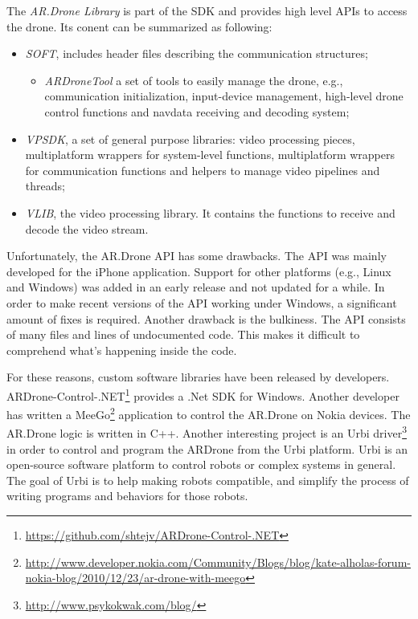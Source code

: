 The \textit{AR.Drone Library} is part of the SDK and provides high level APIs to access the drone.
Its conent can be summarized as following:
\begin{itemize}
\item \textit{SOFT}, includes header files describing the communication structures;
	\begin{itemize}
		\item \textit{ARDroneTool} a set of tools to easily manage the drone, e.g., communication initialization, input-device management, high-level drone control functions and navdata receiving and decoding system;
	\end{itemize}
\item \textit{VPSDK}, a set of general purpose libraries: video processing pieces, multiplatform wrappers for system-level functions, multiplatform wrappers for communication functions and helpers to manage video pipelines and threads;
\item \textit{VLIB}, the video processing library. It contains the functions to receive and decode the video stream.
\end{itemize}

Unfortunately, the AR.Drone API has some drawbacks.
The API was mainly developed for the iPhone application.
Support for other platforms (e.g., Linux and Windows) was added in an early release and not updated for a while.
In order to make recent versions of the API working under Windows, a significant amount of fixes is required.
Another drawback is the bulkiness.
The API consists of many files and lines of undocumented code.
This makes it difficult to comprehend what's happening inside the code.

For these reasons, custom software libraries have been released by developers.
ARDrone-Control-.NET\footnote{\url{https://github.com/shtejv/ARDrone-Control-.NET}} provides a .Net SDK for Windows.
Another developer has written a MeeGo\footnote{\url{http://www.developer.nokia.com/Community/Blogs/blog/kate-alholas-forum-nokia-blog/2010/12/23/ar-drone-with-meego}} application to control the AR.Drone on Nokia devices. The AR.Drone logic is written in C++.
Another interesting project is an Urbi driver\footnote{\url{http://www.psykokwak.com/blog/}} in order to control and program the ARDrone from the Urbi platform.
Urbi is an open-source software platform to control robots or complex systems in general. The goal of Urbi is to help making robots compatible, and simplify the process of writing programs and behaviors for those robots. 